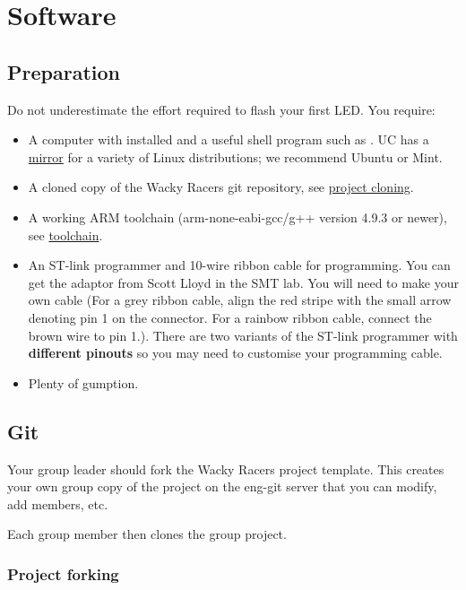 \label{software}
\chapter{Software}



\section{Preparation}
\label{preparation}

Do not underestimate the effort required to flash your first LED. You
require:

\begin{itemize}
\item
  A computer with  installed and a useful shell program such as
  . UC has a \href{http://ucmirror.canterbury.ac.nz/}{mirror}
  for a variety of Linux distributions; we recommend Ubuntu or Mint.

\item A cloned copy of the Wacky Racers git repository, see \hyperref[project-cloning]{project cloning}.

\item
  A working ARM toolchain (arm-none-eabi-gcc/g++ version 4.9.3 or newer), see \hyperref[toolchain]{toolchain}.

\item
  An ST-link programmer and 10-wire ribbon cable for programming. You
  can get the adaptor from Scott Lloyd in the SMT lab. You will need
  to make your own cable (For a grey ribbon cable, align the red
  stripe with the small arrow denoting pin 1 on the connector. For a
  rainbow ribbon cable, connect the brown wire to pin 1.). There are
  two variants of the ST-link programmer with \textbf{different
  pinouts} so you may need to customise your programming cable.
\item
  Plenty of gumption.
\end{itemize}


\section{Git}

Your group leader should fork the Wacky Racers project template.  This
creates your own group copy of the project on the eng-git server that
you can modify, add members, etc.

Each group member then clones the group project.


\subsection{Project forking}
\label{project-forking}

